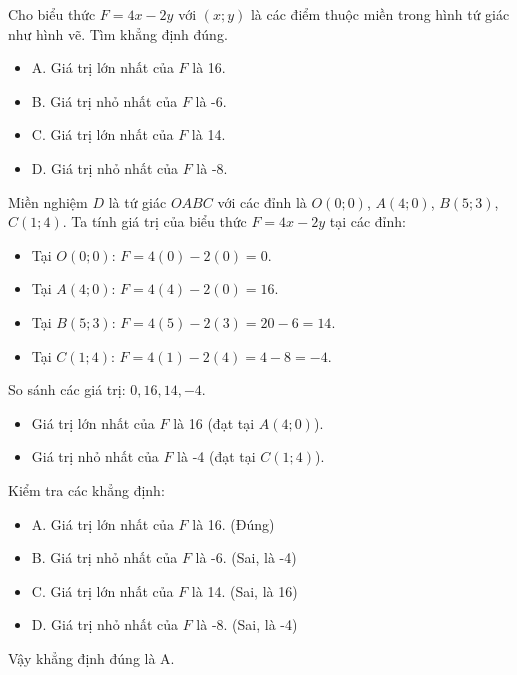 \begin{emcothe}
Cho biểu thức $F=4x - 2y$ với $(x;y)$ là các điểm thuộc miền trong hình tứ giác như hình vẽ. Tìm khẳng định đúng.
\begin{center}
\end{center}
\begin{itemize}
    \item A. Giá trị lớn nhất của $F$ là 16.
    \item B. Giá trị nhỏ nhất của $F$ là -6.
    \item C. Giá trị lớn nhất của $F$ là 14.
    \item D. Giá trị nhỏ nhất của $F$ là -8.
\end{itemize}
Miền nghiệm $D$ là tứ giác $OABC$ với các đỉnh là $O(0;0)$, $A(4;0)$, $B(5;3)$, $C(1;4)$.
Ta tính giá trị của biểu thức $F = 4x - 2y$ tại các đỉnh:
\begin{itemize}
    \item Tại $O(0;0)$: $F = 4(0) - 2(0) = 0$.
    \item Tại $A(4;0)$: $F = 4(4) - 2(0) = 16$.
    \item Tại $B(5;3)$: $F = 4(5) - 2(3) = 20 - 6 = 14$.
    \item Tại $C(1;4)$: $F = 4(1) - 2(4) = 4 - 8 = -4$.
\end{itemize}
So sánh các giá trị: $0, 16, 14, -4$.
\begin{itemize}
    \item Giá trị lớn nhất của $F$ là 16 (đạt tại $A(4;0)$).
    \item Giá trị nhỏ nhất của $F$ là -4 (đạt tại $C(1;4)$).
\end{itemize}
Kiểm tra các khẳng định:
\begin{itemize}
    \item A. Giá trị lớn nhất của $F$ là 16. (Đúng)
    \item B. Giá trị nhỏ nhất của $F$ là -6. (Sai, là -4)
    \item C. Giá trị lớn nhất của $F$ là 14. (Sai, là 16)
    \item D. Giá trị nhỏ nhất của $F$ là -8. (Sai, là -4)
\end{itemize}
Vậy khẳng định đúng là A.
\end{emcothe}

